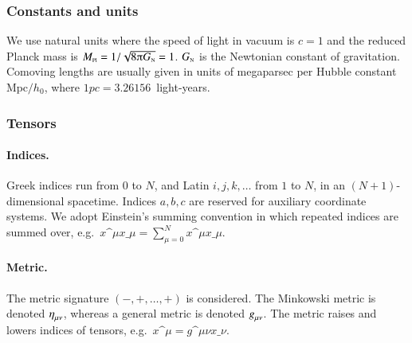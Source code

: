 
\newcommand\Chr{\ChristophelSym}




\subsubsection{Constants and units}
We use natural units where the speed of light in vacuum is $c=1$ and the reduced Planck mass is $M\nped{Pl}=1/\sqrt{8\ppi G\nped{N}}=1$. $G_{\text{\tiny{N}}}$ is the Newtonian constant of gravitation. Comoving lengths are usually given in units of megaparsec per Hubble constant $\mathrm{Mpc}/h_0$, where $1\unit{pc}=3.26156$~light-years.
%

\subsubsection{Tensors}

\paragraph{Indices.} %
Greek indices run from $0$ to $N$, and Latin $i,j,k, \dots$ from $1$ to $N$, in an $(N+1)$-dimensional spacetime. Indices $a,b,c$ are reserved for auxiliary coordinate systems. We adopt Einstein's summing convention in which repeated indices are 
summed over, e.g.~$x\^\mu x\_\mu= \sum_{\mu=0}^N x\^{\mu} x\_{\mu}$.

\paragraph{Metric.} %
The metric signature $(-,+,\dots,+)$ is considered. %
The Minkowski metric is denoted $\eta\indices{_{\mu\nu}}$, whereas a general metric is denoted $g\indices{_{\mu\nu}}$. 
The metric raises and lowers indices of tensors, e.g.~$x\^\mu = g\^{\mu\nu}x\_\nu$.

